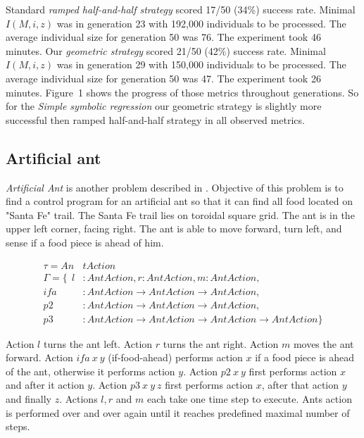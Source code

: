 \documentclass{llncs}
\newcommand{\ar}{\rightarrow\xspace}
\begin{document}
Standard \textit{ramped half-and-half strategy} scored 17/50 (34\%) success rate. 
Minimal $I(M,i,z)$ was in generation 23 with 192,000 individuals to be processed.
The average individual size for generation 50 was 76.
The experiment took 46 minutes.
Our \textit{geometric strategy} scored 21/50 (42\%) success rate. 
Minimal $I(M,i,z)$ was in generation 29 with 150,000 individuals to be processed.
The average individual size for generation 50 was 47.
The experiment took 26 minutes.
Figure~1 shows the progress of those metrics throughout generations.
So for the \textit{Simple symbolic regression}
our geometric strategy is slightly more successful then 
ramped half-and-half strategy in all observed metrics.

\subsection{Artificial ant}
\textit{Artificial Ant} is another problem described
in \cite{koza92}. Objective of this problem is to 
find a control program for an artificial ant so
that it can find all food located on "Santa Fe" trail.
The Santa Fe trail lies on toroidal square grid.
The ant is in the upper left corner, facing right.
The ant is able to move forward, turn left, and sense if a food 
piece is ahead of him.

\begin{align*}
\tau = An&tAction\\
\Gamma = \{~~
  l    &: AntAction                              ,
  r    : AntAction                               ,
  m    : AntAction                               ,\\
  ifa  &: AntAction \ar AntAction \ar AntAction  ,\\
  p2   &: AntAction \ar AntAction \ar AntAction  ,\\
  p3   &: AntAction \ar AntAction \ar AntAction \ar AntAction  \}
\end{align*}

Action $l$ turns the ant left. 
Action $r$ turns the ant right.
Action $m$ moves the ant forward.
Action $ifa~x~y$ (if-food-ahead) performs action $x$ 
if a food piece is ahead of the ant,
otherwise it performs action $y$.
Action $p2~x~y$ first performs action $x$ and after it action $y$.
Action $p3~x~y~z$ first performs action $x$, 
after that action $y$ and finally $z$.
Actions $l, r$ and $m$ each take one time step to execute.
Ants action is performed over and over again until it reaches predefined
maximal number of steps. 
\end{document}
